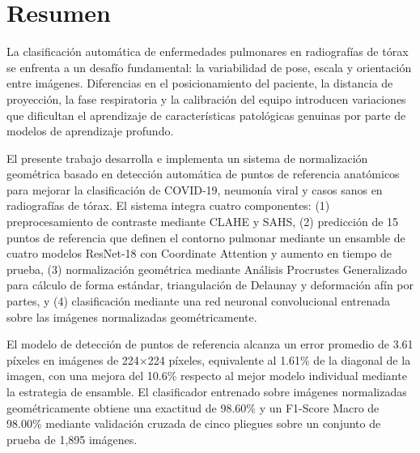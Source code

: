 
\section*{Resumen}

La clasificaci\'on autom\'atica de enfermedades pulmonares en radiograf\'ias de t\'orax se enfrenta a un desaf\'io fundamental: la variabilidad de pose, escala y orientación entre im\'agenes. Diferencias en el posicionamiento del paciente, la distancia de proyecci\'on, la fase respiratoria y la calibraci\'on del equipo introducen variaciones que dificultan el aprendizaje de caracter\'isticas patol\'ogicas genuinas por parte de modelos de aprendizaje profundo.

El presente trabajo desarrolla e implementa un sistema de normalizaci\'on geom\'etrica basado en detecci\'on autom\'atica de puntos de referencia anat\'omicos para mejorar la clasificaci\'on de COVID-19, neumon\'ia viral y casos sanos en radiograf\'ias de t\'orax. El sistema integra cuatro componentes: (1) preprocesamiento de contraste mediante CLAHE y SAHS, (2) predicci\'on de 15 puntos de referencia que definen el contorno pulmonar mediante un ensamble de cuatro modelos ResNet-18 con Coordinate Attention y aumento en tiempo de prueba, (3) normalizaci\'on geom\'etrica mediante An\'alisis Procrustes Generalizado para c\'alculo de forma est\'andar, triangulaci\'on de Delaunay y deformaci\'on af\'in por partes, y (4) clasificaci\'on mediante una red neuronal convolucional entrenada sobre las im\'agenes normalizadas geométricamente.

El modelo de detecci\'on de puntos de referencia alcanza un error promedio de 3.61 p\'ixeles en im\'agenes de 224$\times$224 p\'ixeles, equivalente al 1.61\% de la diagonal de la imagen, con una mejora del 10.6\% respecto al mejor modelo individual mediante la estrategia de ensamble. El clasificador entrenado sobre im\'agenes normalizadas geom\'etricamente obtiene una exactitud de 98.60\% y un F1-Score Macro de 98.00\% mediante validaci\'on cruzada de cinco pliegues sobre un conjunto de prueba de 1,895 im\'agenes.

